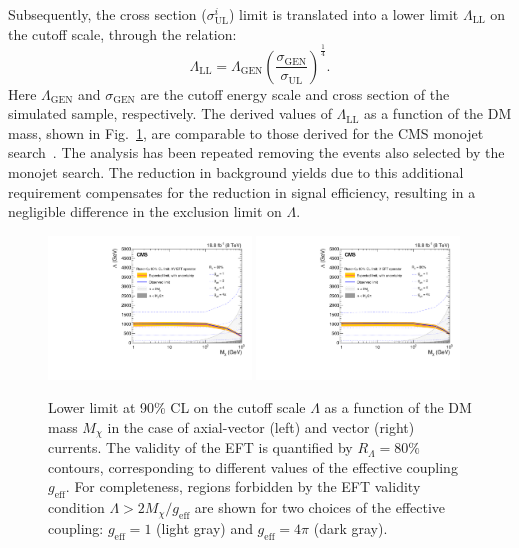 Subsequently, the cross section ($\sigma^{i}_{\mathrm{UL}}$) limit is translated into a lower limit $\Lambda_{\mathrm{LL}}$ on
the cutoff scale, through the relation:
\begin{equation}
\Lambda_\mathrm{LL} = \Lambda_\text{GEN} \left(\frac{\sigma_\text{GEN}}{\sigma_\mathrm{UL}}\right)^\frac{1}{4}.
\end{equation}
Here $\Lambda_\text{GEN}$ and $\sigma_\text{GEN}$ are the cutoff
energy scale and cross section of the simulated sample, respectively.
The derived values of $\Lambda_\mathrm{LL}$ as a function of the DM mass,
shown in Fig.~\ref{fig:LambdaLimit}, are comparable to those derived
for the CMS monojet search~\cite{monojet8TeV}.  The analysis has been
repeated removing the events also selected by the monojet search.  The
reduction in background yields due to this additional requirement
compensates for the reduction in signal efficiency, resulting in a
negligible difference in the exclusion limit on $\Lambda$.
\begin{figure}
\centering
\includegraphics[width=0.48\textwidth, angle=0.]{Limits/Final_av_Lambda_VarCoupling_80Percent_vNov9_2015_CWR.pdf}
\includegraphics[width=0.48\textwidth]{Limits/Final_v_Lambda_VarCoupling_80Percent_vNov9_2015_CWR.pdf}
\caption{Lower limit at 90\% CL on the cutoff scale $\Lambda$ as a
  function of the DM mass $M_\chi$ in the case of
  axial-vector (left) and vector (right) currents. The validity of the EFT
  is quantified by $R_\Lambda = 80\%$ contours, corresponding to
  different values of the effective coupling
  $g_\text{eff}$. For completeness, regions forbidden by the
  EFT validity condition $\Lambda > 2M_\chi/g_\text{eff}$  are shown for two choices of the
effective coupling:  $g_\text{eff} = 1$ (light gray) and $g_\text{eff}= 4\pi$ (dark gray).\label{fig:LambdaLimit}}
\end{figure}

